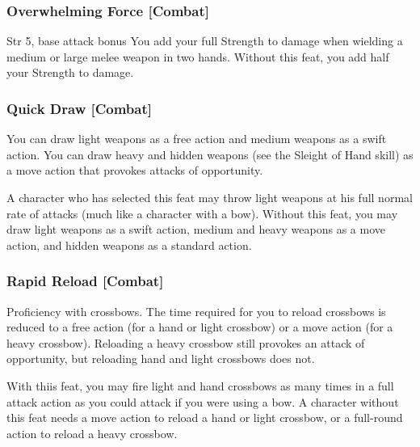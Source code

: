 \subsubsection{Overwhelming Force [Combat]}
 Str 5, base attack bonus 
 You add your full Strength to damage when wielding a medium or large melee weapon in two hands.
 Without this feat, you add half your Strength to damage.

\subsubsection{Quick Draw [Combat]}
 You can draw light weapons as a free action and medium weapons as a swift action. You can draw heavy and hidden weapons (see the Sleight of Hand skill) as a move action that provokes attacks of opportunity.
\par A character who has selected this feat may throw light weapons at his full normal rate of attacks (much like a character with a bow).
 Without this feat, you may draw light weapons as a swift action, medium and heavy weapons as a move action, and hidden weapons as a standard action.

\subsubsection{Rapid Reload [Combat]}
 Proficiency with crossbows.
 The time required for you to reload crossbows is reduced to a free action (for a hand or light crossbow) or a move action (for a heavy crossbow). Reloading a heavy crossbow still provokes an attack of opportunity, but reloading hand and light crossbows does not.
\par With thiis feat, you may fire light and hand crossbows as many times in a full attack action as you could attack if you were using a bow.
 A character without this feat needs a move action to reload a hand or light crossbow, or a full-round action to reload a heavy crossbow.


